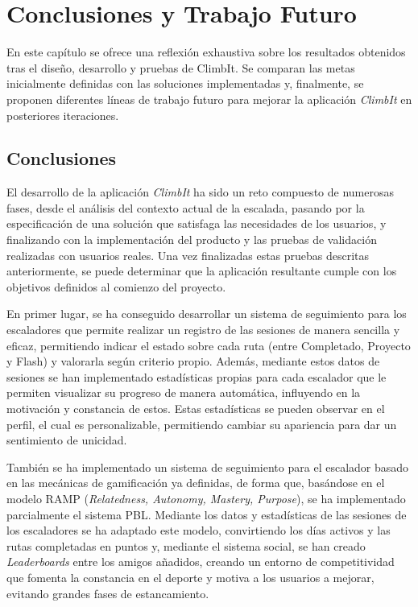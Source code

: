 \chapter{Conclusiones y Trabajo Futuro}
\label{cap:conclusiones}

En este capítulo se ofrece una reflexión exhaustiva sobre los resultados obtenidos tras el diseño, desarrollo y pruebas de ClimbIt. Se comparan las metas inicialmente definidas con las soluciones implementadas y, finalmente, se proponen diferentes líneas de trabajo futuro para mejorar la aplicación \textit{ClimbIt} en posteriores iteraciones.

\section{Conclusiones}

El desarrollo de la aplicación \textit{ClimbIt} ha sido un reto compuesto de numerosas fases, desde el análisis del contexto actual de la escalada, pasando por la especificación de una solución que satisfaga las necesidades de los usuarios, y finalizando con la implementación del producto y las pruebas de validación realizadas con usuarios reales. Una vez finalizadas estas pruebas descritas anteriormente, se puede determinar que la aplicación resultante cumple con los objetivos definidos al comienzo del proyecto.

En primer lugar, se ha conseguido desarrollar un sistema de seguimiento para los escaladores que permite realizar un registro de las sesiones de manera sencilla y eficaz, permitiendo indicar el estado sobre cada ruta (entre Completado, Proyecto y Flash) y valorarla según criterio propio. Además, mediante estos datos de sesiones se han implementado estadísticas propias para cada escalador que le permiten visualizar su progreso de manera automática, influyendo en la motivación y constancia de estos. Estas estadísticas se pueden observar en el perfil, el cual es personalizable, permitiendo cambiar su apariencia para dar un sentimiento de unicidad.

También se ha implementado un sistema de seguimiento para el escalador basado en las mecánicas de gamificación ya definidas, de forma que, basándose en el modelo RAMP (\textit{Relatedness, Autonomy, Mastery, Purpose}), se ha implementado parcialmente el sistema PBL. Mediante los datos y estadísticas de las sesiones de los escaladores se ha adaptado este modelo, convirtiendo los días activos y las rutas completadas en puntos y, mediante el sistema social, se han creado \textit{Leaderboards} entre los amigos añadidos, creando un entorno de competitividad que fomenta la constancia en el deporte y motiva a los usuarios a mejorar, evitando grandes fases de estancamiento.

